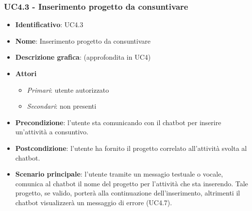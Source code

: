 \subsubsection{UC4.3 - Inserimento progetto da consuntivare}
\begin{itemize}
    \item \textbf{Identificativo}: UC4.3 
    \item \textbf{Nome}: Inserimento progetto da consuntivare  
    \item \textbf{Descrizione grafica}: (approfondita in UC4)
    \item \textbf{Attori}
        \begin{itemize} 
            \item \textit{Primari}: utente autorizzato
            \item \textit{Secondari}: non presenti
        \end{itemize}
    \item \textbf{Precondizione}: l'utente sta comunicando con il chatbot per inserire un'attività a consuntivo. 
    \item \textbf{Postcondizione}: l'utente ha fornito il progetto correlato all'attività svolta al chatbot. 
    \item \textbf{Scenario principale}: l'utente tramite un messagio testuale o vocale, comunica al chatbot il nome del progetto per l'attività che sta inserendo. Tale progetto, se valido, porterà alla continuazione dell'inserimento, altrimenti il chatbot visualizzerà un messaggio di errore (UC4.7). 
\end{itemize}

